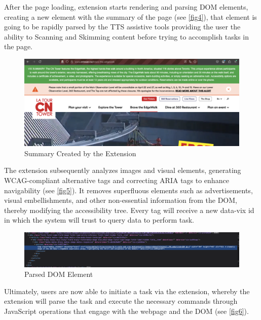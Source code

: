 \documentclass[conference]{IEEEtran}
\begin{document}
After the page loading, extension starts rendering and parsing DOM elements, creating a new element with the summary of the page (see \autoref{fig4}), that element is going to be rapidly parsed by the TTS assistive tools providing the user the ability to Scanning and Skimming content before trying to accomplish tasks in the page.

\begin{figure}[!t]
\centering
\includegraphics[width=\columnwidth]{images/3.png}
\caption{Summary Created by the Extension}
\label{fig4}
\end{figure}

The extension subsequently analyzes images and visual elements, generating WCAG-compliant alternative tags and correcting ARIA tags to enhance navigability (see \autoref{fig5}). It removes superfluous elements such as advertisements, visual embellishments, and other non-essential information from the DOM, thereby modifying the accessibility tree. Every tag will receive a new data-vix id in which the system will trust to query data to perform task.

\begin{figure}[!t]
\centering
\includegraphics[width=\columnwidth]{images/4.png}
\caption{Parsed DOM Element}
\label{fig5}
\end{figure}

Ultimately, users are now able to initiate a task via the extension, whereby the extension will parse the task and execute the necessary commands through JavaScript operations that engage with the webpage and the DOM (see \autoref{fig6}).
\end{document}
